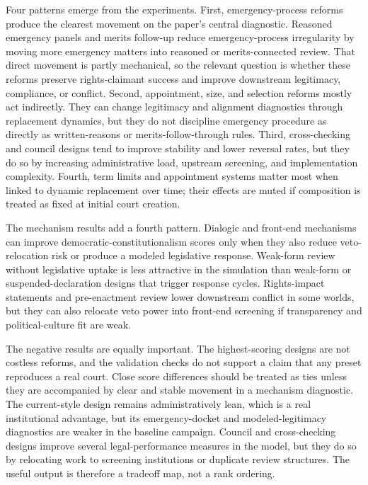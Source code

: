 \documentclass[
  journal=small,
  manuscript=research-article,
  year=2026
]{cup-journal}
\begin{document}
Four patterns emerge from the experiments. First, emergency-process reforms produce the clearest movement on the paper's central diagnostic. Reasoned emergency panels and merits follow-up reduce emergency-process irregularity by moving more emergency matters into reasoned or merits-connected review. That direct movement is partly mechanical, so the relevant question is whether these reforms preserve rights-claimant success and improve downstream legitimacy, compliance, or conflict. Second, appointment, size, and selection reforms mostly act indirectly. They can change legitimacy and alignment diagnostics through replacement dynamics, but they do not discipline emergency procedure as directly as written-reasons or merits-follow-through rules. Third, cross-checking and council designs tend to improve stability and lower reversal rates, but they do so by increasing administrative load, upstream screening, and implementation complexity. Fourth, term limits and appointment systems matter most when linked to dynamic replacement over time; their effects are muted if composition is treated as fixed at initial court creation.

The mechanism results add a fourth pattern. Dialogic and front-end mechanisms can improve democratic-constitutionalism scores only when they also reduce veto-relocation risk or produce a modeled legislative response. Weak-form review without legislative uptake is less attractive in the simulation than weak-form or suspended-declaration designs that trigger response cycles. Rights-impact statements and pre-enactment review lower downstream conflict in some worlds, but they can also relocate veto power into front-end screening if transparency and political-culture fit are weak.

The negative results are equally important. The highest-scoring designs are not costless reforms, and the validation checks do not support a claim that any preset reproduces a real court. Close score differences should be treated as ties unless they are accompanied by clear and stable movement in a mechanism diagnostic. The current-style design remains administratively lean, which is a real institutional advantage, but its emergency-docket and modeled-legitimacy diagnostics are weaker in the baseline campaign. Council and cross-checking designs improve several legal-performance measures in the model, but they do so by relocating work to screening institutions or duplicate review structures. The useful output is therefore a tradeoff map, not a rank ordering.
\end{document}
